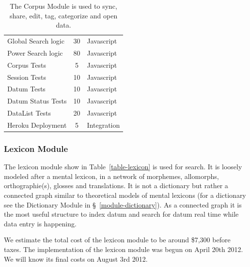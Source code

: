 \documentclass[12pt]{article}
\begin{document}
\begin{table}[htbp]
\begin{center}
\begin{tabular}{ | lcl | }
Global Search logic&  30&  Javascript \\ 
Power Search logic& 80&  Javascript \\ 
Corpus Tests& 5&  Javascript \\ 
Session Tests&  10&  Javascript \\ 
Datum Tests&  10&  Javascript \\ 
Datum Status Tests& 10&  Javascript \\ 
DataList Tests& 20&  Javascript \\ 
Heroku Deployment&  5&  Integration \\ 
\hline
  \end{tabular}
 \caption{The Corpus Module is used to sync, share, edit, tag, categorize and open data. }
\label{table-corpus}
  \end{center}
\end{table}


\newpage
\subsubsection{Lexicon Module}

The lexicon module show in Table~\ref{table-lexicon} is used for search. It is loosely modeled after a mental lexicon, in a network of morphemes, allomorphs, orthographie(s), glosses and translations.  It is not a dictionary but rather a connected graph similar to theoretical models of mental lexicons (for a dictionary see the Dictionary Module in \S~\ref{module-dictionary}). As a connected graph it is the most useful structure to index datum and search for datum real time while data entry is happening. 

We estimate the total cost of the lexicon module to be around \$7,300 before taxes. The implementation of the lexicon module was begun on April 20th 2012. We will know its final costs on August 3rd 2012.
\end{document}
